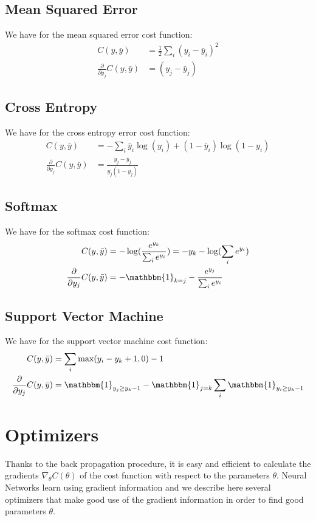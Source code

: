\documentclass{article} %
\begin{document}
\subsection{Mean Squared Error}
We have for the mean squared error cost function:
$$
\begin{aligned}
C(y,\bar{y})  &= \frac{1}{2} \sum_i (y_i - \bar{y}_i)^2\\
\frac{\partial}{\partial y_j}C(y,\bar{y}) &= (y_j - \bar{y}_j)
\end{aligned}
$$

\subsection{Cross Entropy}
We have for the cross entropy error cost function:
$$
\begin{aligned}
C(y,\bar{y}) &= - \sum_i \bar{y}_i \log(y_i) + (1-\bar{y}_i) \log(1-y_i)\\
\frac{\partial}{\partial y_j} C(y,\bar{y}) &= \frac{y_j - \bar{y}_j}{y_j(1-y_j)}
\end{aligned}
$$


\subsection{Softmax}
We have for the softmax cost function:
$$
\begin{aligned}
C(y,\bar{y}) &= -\log(\frac{e^{y_k}}{\sum_i e^{y_i}}) = -y_k - \log(\sum_i e^{y_i}) \\
\frac{\partial}{\partial y_j}C(y,\bar{y}) &= -\mathbbm{1}_{k=j} - \frac{e^{y_j}}{\sum_i e^{y_i}}
\end{aligned}
$$


\subsection{Support Vector Machine}
We have for the support vector machine cost function:
$$
\begin{aligned}
C(y,\bar{y}) &= \sum_i \text{max}(y_i-y_k+1, 0) -1\\
\frac{\partial}{\partial y_j}C(y,\bar{y}) &= \mathbbm{1}_{y_j\geq y_k-1}-\mathbbm{1}_{j=k}\sum_i\mathbbm{1}_{y_i\geq y_k-1} 
\end{aligned}
$$

\newpage
\section{Optimizers}
Thanks to the back propagation procedure, it is easy and efficient to calculate the gradients $\nabla_{\theta} C (\theta)$ of the cost function with respect to the parameters $\theta$. Neural Networks learn using gradient information and we describe here several optimizers that make good use of the gradient information in order to find good parameters $\theta$.
\end{document}
